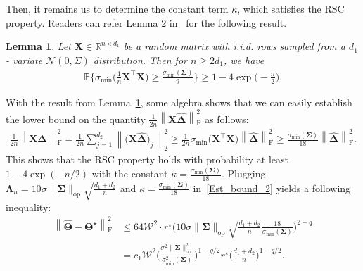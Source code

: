 \documentclass[12pt]{article}
\newtheorem{lemma}[theorem]{Lemma}
\begin{document}
\noindent 
Then, it remains us to determine the constant term $\kappa$, which satisfies the RSC property.
Readers can refer Lemma $2$ in~\citet{negahban2011estimation} for the following result.
\begin{lemma}\label{RSC_Consts}
Let $\boldsymbol{X} \in \mathbb{R}^{n \times d_{1}}$ be a random matrix with i.i.d. rows sampled from a $d_{1}$-
variate $\mathcal{N}(0,\Sigma)$ distribution. Then for $n \geq 2d_{1}$, we have 
\begin{align*}
    \mathbb{P}\Bigg\{ \sigma_{\text{min}}\bigg(\frac{1}{n}\boldsymbol{X}^{\top}\boldsymbol{X}\bigg) \geq \frac{\sigma_{\text{min}}(\boldsymbol{\Sigma})}{9} \Bigg\} \geq 1 - 4\exp \bigg( -\frac{n}{2} \bigg).
\end{align*}
\end{lemma}
\noindent
With the result from Lemma~\ref{RSC_Consts}, some algebra shows that 
we can easily establish the lower bound on the quantity $\frac{1}{2n} \left\| \boldsymbol{X}\boldsymbol{\widehat{\Delta}} \right\|_{\text{F}}^{2}$ as follows: 
\begin{align*}
    \frac{1}{2n} \left\| \boldsymbol{X}\boldsymbol{\widehat{\Delta}} \right\|_{\text{F}}^{2}
    = \frac{1}{2n} \sum_{j=1}^{d_{2}} \left\| \big(\boldsymbol{X}\boldsymbol{\widehat{\Delta}}\big)_{j} \right\|_{2}^{2}
    \geq \frac{1}{2n}\sigma_{\text{min}}\big( \boldsymbol{X}^{\top} \boldsymbol{X} \big) 
    \left\| \boldsymbol{\widehat{\Delta}} \right\|_{\text{F}}^{2} 
    \geq \frac{\sigma_{\text{min}}(\boldsymbol{\Sigma})}{18} \left\| \boldsymbol{\widehat{\Delta}} \right\|_{\text{F}}^{2}.
\end{align*}
This shows that the RSC property holds with probability at least $ 1 - 4\exp ( -n/2 )$ with the constant $\kappa=\frac{\sigma_{\text{min}}(\boldsymbol{\Sigma})}{18}$. 
Plugging $\boldsymbol{\Lambda}_{n}=10 \sigma \|\boldsymbol{\Sigma}\|_{\text{op}} \sqrt{\frac{d_{1}+d_{2}}{n}}$ and $\kappa = \frac{\sigma_{\text{min}}(\boldsymbol{\Sigma})}{18}$ in~\eqref{Est_bound_2} yields a following inequality:
\begin{align*}
    \left\| \widehat{\boldsymbol{\Theta}} - \boldsymbol{\Theta^{\star}} \right\|_{\text{F}}^{2}
    &\leq 64 \mathcal{W}^{2} \cdot r^{\star} \Bigg(10 \sigma \|\boldsymbol{\Sigma}\|_{\text{op}} \sqrt{\frac{d_{1}+d_{2}}{n}} \frac{18}{\sigma_{\text{min}}(\boldsymbol{\Sigma})} \Bigg)^{2-q} \\
    &= c_{1} \mathcal{W}^{2} \Bigg( \frac{\sigma^{2}\|\boldsymbol{\Sigma}\|_{\text{op}}^{2}}{\sigma_{\text{min}}^{2}(\boldsymbol{\Sigma})} \Bigg)^{1-q/2} r^{\star} \Bigg( \frac{d_{1}+d_{2}}{n} \Bigg)^{1-q/2}.
\end{align*}
\end{document}
